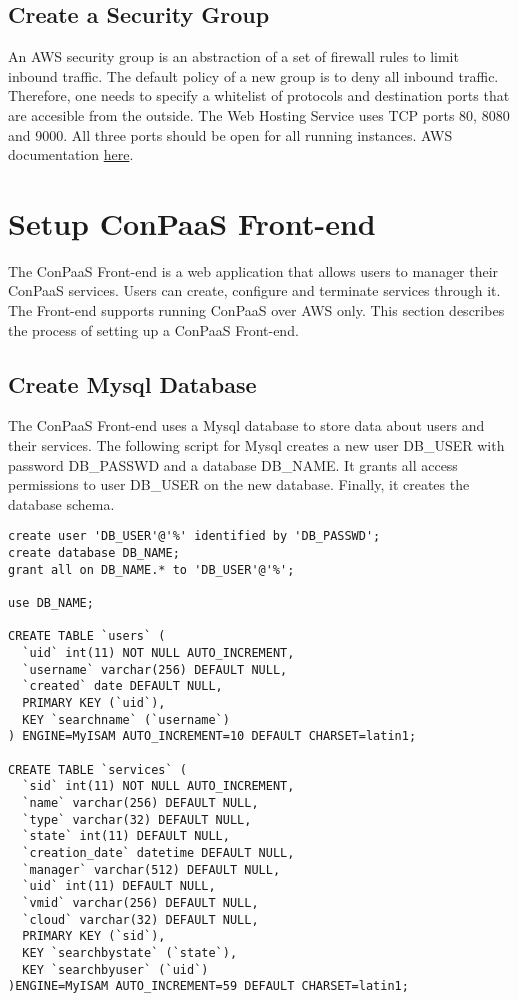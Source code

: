 \documentclass[12pt]{article}
\newenvironment{framedbox}[1]%
{\begin{framed}
 \begingroup
 \fontsize{#1}{#1}\selectfont
}
{
 \endgroup
 \end{framed}
}
\begin{document}
\subsection{Create a Security Group}
An AWS security group is an abstraction of a set of firewall rules to limit
inbound traffic. The default policy of a new group is to deny all inbound
traffic. Therefore, one needs to specify a whitelist of protocols and
destination ports that are accesible from the outside.
The Web Hosting Service uses TCP ports 80, 8080 and 9000. All three ports
should be open for all running instances.
AWS documentation \href{http://docs.amazonwebservices.com/AWSEC2/latest/UserGuide/index.html?using-network-security.html}{here}.


\section{Setup ConPaaS Front-end}
The ConPaaS Front-end is a web application that allows users to manager their
ConPaaS services. Users can create, configure and terminate services through
it. The Front-end supports running ConPaaS over AWS only. This section
describes the process of setting up a ConPaaS Front-end.

\subsection{Create Mysql Database}
The ConPaaS Front-end uses a Mysql database to store data about users and their
services. The following script for Mysql creates a new user DB\_USER with
password DB\_PASSWD and a database DB\_NAME. It grants all access permissions
to user DB\_USER on the new database. Finally, it creates the database schema.

\begin{framedbox}{12pt}\begin{verbatim}
create user 'DB_USER'@'%' identified by 'DB_PASSWD';
create database DB_NAME;
grant all on DB_NAME.* to 'DB_USER'@'%';

use DB_NAME;

CREATE TABLE `users` (
  `uid` int(11) NOT NULL AUTO_INCREMENT,
  `username` varchar(256) DEFAULT NULL,
  `created` date DEFAULT NULL,
  PRIMARY KEY (`uid`),
  KEY `searchname` (`username`)
) ENGINE=MyISAM AUTO_INCREMENT=10 DEFAULT CHARSET=latin1;

CREATE TABLE `services` (
  `sid` int(11) NOT NULL AUTO_INCREMENT,
  `name` varchar(256) DEFAULT NULL,
  `type` varchar(32) DEFAULT NULL,
  `state` int(11) DEFAULT NULL,
  `creation_date` datetime DEFAULT NULL,
  `manager` varchar(512) DEFAULT NULL,
  `uid` int(11) DEFAULT NULL,
  `vmid` varchar(256) DEFAULT NULL,
  `cloud` varchar(32) DEFAULT NULL,
  PRIMARY KEY (`sid`),
  KEY `searchbystate` (`state`),
  KEY `searchbyuser` (`uid`)
)ENGINE=MyISAM AUTO_INCREMENT=59 DEFAULT CHARSET=latin1;
\end{verbatim}\end{framedbox}
\end{document}
